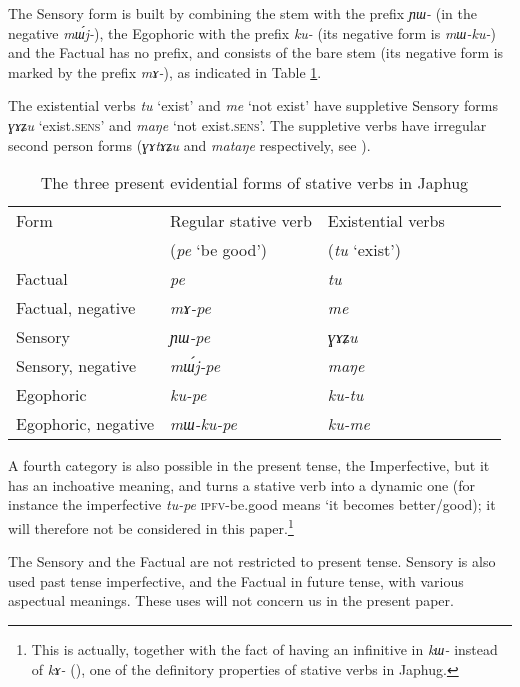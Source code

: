 \documentclass[oldfontcommands,oneside,a4paper,11pt]{article}
\newcommand{\ipa}[1]{{\phon\textit{#1}}} %
\begin{document}
The Sensory form is built by combining the stem with the  prefix \ipa{ɲɯ-} (in the negative \ipa{mɯ́j-}), the Egophoric with the prefix \ipa{ku-} (its negative form is \ipa{mɯ-ku-}) and the Factual has no prefix, and consists of the bare stem (its negative form is marked by the prefix \ipa{mɤ-}), as indicated in Table \ref{tab:three}.

The existential verbs \ipa{tu} `exist' and \ipa{me} `not exist' have suppletive Sensory forms \ipa{ɣɤʑu} `exist.\textsc{sens}' and \ipa{maŋe} `not exist.\textsc{sens}'. The suppletive verbs have irregular second person forms (\ipa{ɣɤtɤʑu} and \ipa{mataŋe} respectively, see \citealt{jacques12agreement}).

\begin{table}[H]
\caption{The three present evidential forms of stative verbs in Japhug} \label{tab:three} \centering
\begin{tabular}{llllll}
\toprule
Form & Regular stative verb & Existential verbs \\
&(\ipa{pe} `be good') & (\ipa{tu} `exist') \\
\midrule
Factual & \ipa{pe} & \ipa{tu} \\
Factual, negative & \ipa{mɤ-pe} & \ipa{me} \\
Sensory & \ipa{ɲɯ-pe} & \ipa{ɣɤʑu} \\
Sensory, negative & \ipa{mɯ́j-pe} & \ipa{maŋe} \\
Egophoric &  \ipa{ku-pe} & \ipa{ku-tu} \\
Egophoric, negative & \ipa{mɯ-ku-pe} & \ipa{ku-me} \\
\midrule
\end{tabular}
\end{table}

A fourth category is also possible in the present tense, the Imperfective, but it has an inchoative meaning, and turns a stative verb into a dynamic one (for instance the imperfective \ipa{tu-pe} \textsc{ipfv}-be.good means `it becomes better/good); it will therefore not be considered in this paper.\footnote{This is actually, together with the fact of having an infinitive in \ipa{kɯ-} instead of \ipa{kɤ-} (\citealt[227]{jacques16complementation}), one of the definitory properties of stative verbs in Japhug.}

The Sensory and the Factual are not restricted to present tense. Sensory is also used past tense imperfective, and the Factual in future tense, with various aspectual meanings. These uses will not concern us in the present paper.
\end{document}
